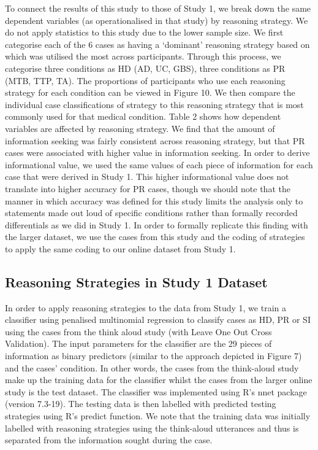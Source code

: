 \documentclass[a4paper, nobind]{templates/ociamthesis}
\begin{document}
To connect the results of this study to those of Study 1, we break down the same dependent variables (as operationalised in that study) by reasoning strategy. We do not apply statistics to this study due to the lower sample size. We first categorise each of the 6 cases as having a `dominant' reasoning strategy based on which was utilised the most across participants. Through this process, we categorise three conditions as HD (AD, UC, GBS), three conditions as PR (MTB, TTP, TA). The proportions of participants who use each reasoning strategy for each condition can be viewed in Figure 10. We then compare the individual case classifications of strategy to this reasoning strategy that is most commonly used for that medical condition. Table 2 shows how dependent variables are affected by reasoning strategy. We find that the amount of information seeking was fairly consistent across reasoning strategy, but that PR cases were associated with higher value in information seeking. In order to derive informational value, we used the same values of each piece of information for each case that were derived in Study 1. This higher informational value does not translate into higher accuracy for PR cases, though we should note that the manner in which accuracy was defined for this study limits the analysis only to statements made out loud of specific conditions rather than formally recorded differentials as we did in Study 1. In order to formally replicate this finding with the larger dataset, we use the cases from this study and the coding of strategies to apply the same coding to our online dataset from Study 1.

\subsection*{Reasoning Strategies in Study 1 Dataset}\label{reasoning-strategies-in-study-1-dataset}

In order to apply reasoning strategies to the data from Study 1, we train a classifier using penalised multinomial regression to classify cases as HD, PR or SI using the cases from the think aloud study (with Leave One Out Cross Validation). The input parameters for the classifier are the 29 pieces of information as binary predictors (similar to the approach depicted in Figure 7) and the cases' condition. In other words, the cases from the think-aloud study make up the training data for the classifier whilst the cases from the larger online study is the test dataset. The classifier was implemented using R's nnet package (version 7.3-19). The testing data is then labelled with predicted testing strategies using R's predict function. We note that the training data was initially labelled with reasoning strategies using the think-aloud utterances and thus is separated from the information sought during the case.
\end{document}
